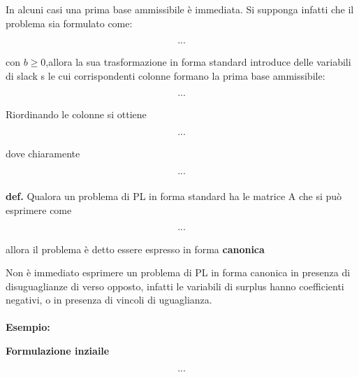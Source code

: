 \documentclass[a4paper, 11pt]{article}
\begin{document}
        In alcuni casi una prima base ammissibile è immediata. Si supponga infatti che il problema sia
        formulato come:

        \begin{align}
            ...
        \end{align}

        con $b \geq 0$,allora la sua trasformazione in forma standard introduce delle variabili di slack s le cui corrispondenti colonne formano la prima base ammissibile: 

        \begin{align}
            ...
        \end{align}

        Riordinando le colonne si ottiene

        \begin{align}
            ...
        \end{align}

        dove chiaramente

        \begin{align}
            ...
        \end{align}

        \paragraph{}
        \textbf{def. }  Qualora un problema di PL in forma standard ha le matrice A che si può esprimere come

        \begin{align}
            ...
        \end{align}

        allora il problema è detto essere espresso in forma \textbf{canonica}

        Non è immediato esprimere un problema di PL in forma canonica in presenza di disuguaglianze di verso opposto, infatti le variabili di surplus hanno coefficienti negativi, o in presenza di vincoli di uguaglianza.


        \paragraph{}
        \textbf{Esempio: }

        \textbf{Formulazione inziaile}

        \begin{align}
            ...
        \end{align}
\end{document}
